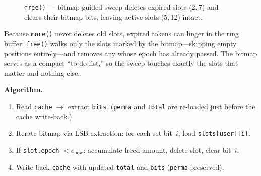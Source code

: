\documentclass[10pt,a4paper,twocolumn]{article}
\begin{document}
\begin{figure}[htbp]
\centering
{}
\caption{\texttt{free()} --- bitmap-guided sweep deletes expired slots (2,\,7) and clears their bitmap bits, leaving active slots (5,\,12) intact.}
\label{fig:free}
\end{figure}

Because \texttt{more()} never deletes old slots, expired tokens can linger in the ring buffer.  \texttt{free()} walks only the slots marked by the bitmap---skipping empty positions entirely---and removes any whose epoch has already passed.  The bitmap serves as a compact ``to-do list,'' so the sweep touches exactly the slots that matter and nothing else.

\textbf{Algorithm.}
\begin{enumerate}[leftmargin=*, nosep]
\item Read \texttt{cache} $\to$ extract \texttt{bits}. (\texttt{perma} and \texttt{total} are re-loaded just before the cache write-back.)
\item Iterate bitmap via LSB extraction: for each set bit~$i$, load \texttt{slots[user][i]}.
\item If \texttt{slot.epoch} $< e_{\text{now}}$: accumulate freed amount, delete slot, clear bit~$i$.
\item Write back \texttt{cache} with updated \texttt{total} and \texttt{bits} (\texttt{perma} preserved).
\end{enumerate}
\end{document}
